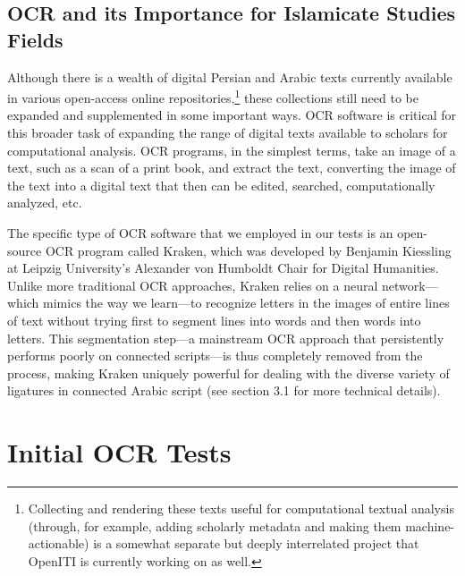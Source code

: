 \subsection{OCR and its Importance for Islamicate Studies Fields}

Although there is a wealth of digital Persian and Arabic texts currently
available in various open-access online repositories,\footnote{Collecting and
rendering these texts useful for computational textual analysis (through, for
example, adding scholarly metadata and making them machine-actionable) is a
somewhat separate but deeply interrelated project that OpenITI is currently
working on as well.} these collections still need to be expanded and
supplemented in some important ways. OCR software is critical for this broader
task of expanding the range of digital texts available to scholars for
computational analysis. OCR programs, in the simplest terms, take an image of a
text, such as a scan of a print book, and extract the text, converting the
image of the text into a digital text that then can be edited, searched,
computationally analyzed, etc.   

The specific type of OCR software that we employed in our tests is an
open-source OCR program called Kraken, which was developed by Benjamin
Kiessling at Leipzig University’s Alexander von Humboldt Chair for Digital
Humanities. Unlike more traditional OCR approaches, Kraken relies on a neural
network—which mimics the way we learn—to recognize letters in the images of
entire lines of text without trying first to segment lines into words and then
words into letters. This segmentation step—a mainstream OCR approach that
persistently performs poorly on connected scripts—is thus completely removed
from the process, making Kraken uniquely powerful for dealing with the diverse
variety of ligatures in connected Arabic script (see section 3.1 for more
technical details).


\section{Initial OCR Tests}


